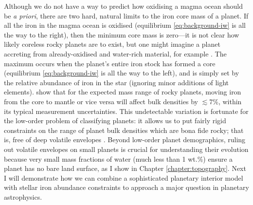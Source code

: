 Although we do not have a way to predict how oxidising a magma ocean should be \textit{a priori}, there are two hard, natural limits to the iron core mass of a planet. If all the iron in the magma ocean is oxidised (equilibrium \eqref{eq:background-iw} is all the way to the right), then the minimum core mass is zero---it is not clear how likely coreless rocky planets are to exist, but one might imagine a planet accreting from already-oxidised and water-rich material, for example \citep{elkins-tanton_coreless_2008}. The maximum occurs when the planet's entire iron stock has formed a core (equilibrium \eqref{eq:background-iw} is all the way to the left), and is simply set by the relative abundance of iron in the star (ignoring minor additions of light elements). \citet{unterborn_nominal_2023} show that for the expected mass range of rocky planets, moving iron from the core to mantle or vice versa will affect bulk densities by $\lesssim$7\%, within its typical measurement uncertainties. This undetectable variation is fortunate for the low-order problem of classifying planets: it allows us to put fairly rigid constraints on the range of planet bulk densities which are bona fide rocky; that is, free of deep volatile envelopes \citep[see][]{unterborn_nominal_2023}. Beyond low-order planet demographics, ruling out volatile envelopes on small planets is crucial for understanding their evolution because very small mass fractions of water (much less than 1 wt.\%) ensure a planet has no bare land surface, as I show in Chapter \ref{chapter:topography}. Next I will demonstrate how we can combine a sophisticated planetary interior model with stellar iron abundance constraints to approach a major question in planetary astrophysics.


